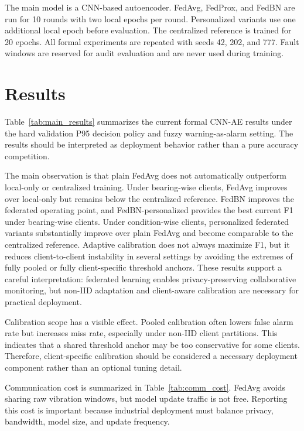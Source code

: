 \documentclass[11pt]{article}
\begin{document}
The main model is a CNN-based autoencoder. FedAvg, FedProx, and FedBN are run for 10 rounds with two local epochs per round. Personalized variants use one additional local epoch before evaluation. The centralized reference is trained for 20 epochs. All formal experiments are repeated with seeds 42, 202, and 777. Fault windows are reserved for audit evaluation and are never used during training.

\section{Results}

Table~\ref{tab:main_results} summarizes the current formal CNN-AE results under the hard validation P95 decision policy and fuzzy warning-as-alarm setting. The results should be interpreted as deployment behavior rather than a pure accuracy competition.



The main observation is that plain FedAvg does not automatically outperform local-only or centralized training. Under bearing-wise clients, FedAvg improves over local-only but remains below the centralized reference. FedBN improves the federated operating point, and FedBN-personalized provides the best current F1 under bearing-wise clients. Under condition-wise clients, personalized federated variants substantially improve over plain FedAvg and become comparable to the centralized reference. Adaptive calibration does not always maximize F1, but it reduces client-to-client instability in several settings by avoiding the extremes of fully pooled or fully client-specific threshold anchors. These results support a careful interpretation: federated learning enables privacy-preserving collaborative monitoring, but non-IID adaptation and client-aware calibration are necessary for practical deployment.

Calibration scope has a visible effect. Pooled calibration often lowers false alarm rate but increases miss rate, especially under non-IID client partitions. This indicates that a shared threshold anchor may be too conservative for some clients. Therefore, client-specific calibration should be considered a necessary deployment component rather than an optional tuning detail.

Communication cost is summarized in Table~\ref{tab:comm_cost}. FedAvg avoids sharing raw vibration windows, but model update traffic is not free. Reporting this cost is important because industrial deployment must balance privacy, bandwidth, model size, and update frequency.
\end{document}
